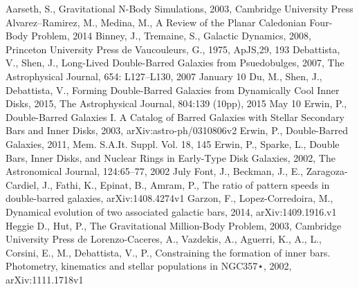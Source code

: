 \documentclass[a4paper,12pt]{article}
\begin{document}

\newpage
\begin{thebibliography}{1}
Aarseth, S., Gravitational N-Body Simulations, 2003, Cambridge University Press
Alvarez–Ramirez, M., Medina, M., A Review of the Planar Caledonian Four-Body Problem, 2014
Binney, J., Tremaine, S., Galactic Dynamics, 2008, Princeton University Press
de Vaucouleurs, G., 1975, ApJS,29, 193
Debattista, V., Shen, J., Long-Lived Double-Barred Galaxies from Psuedobulges, 2007, The Astrophysical Journal, 654: L127–L130, 2007 January 10
Du, M., Shen, J., Debattista, V., Forming Double-Barred Galaxies from Dynamically Cool Inner Disks, 2015, The Astrophysical Journal, 804:139 (10pp), 2015 May 10 
Erwin, P., Double-Barred Galaxies I. A Catalog of Barred Galaxies with Stellar Secondary Bars and Inner Disks, 2003, arXiv:astro-ph/0310806v2
Erwin, P., Double-Barred Galaxies, 2011, Mem. S.A.It. Suppl. Vol. 18, 145
Erwin, P., Sparke, L., Double Bars, Inner Disks, and Nuclear Rings in Early-Type Disk Galaxies, 2002, The Astronomical Journal, 124:65–77, 2002 July
Font, J., Beckman, J., E., Zaragoza-Cardiel, J., Fathi, K., Epinat, B., Amram, P., The ratio of pattern speeds in double-barred galaxies, arXiv:1408.4274v1
Garzon, F., Lopez-Corredoira, M., Dynamical evolution of two associated galactic bars, 2014, arXiv:1409.1916.v1
Heggie D., Hut, P., The Gravitational Million-Body Problem, 2003, Cambridge University Press
de Lorenzo-Caceres, A., Vazdekis, A., Aguerri, K., A., L., Corsini, E., M., Debattista, V., P., Constraining the formation of inner bars. Photometry, kinematics and stellar populations in NGC357⋆, 2002, arXiv:1111.1718v1

\end{thebibliography}
\end{document}

